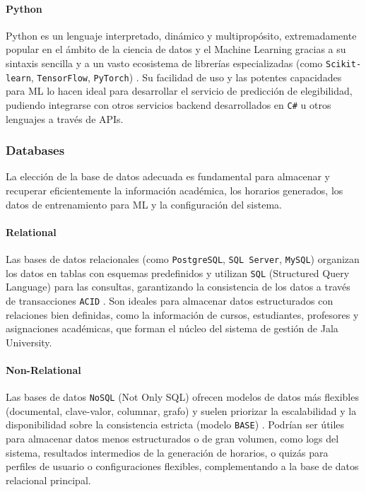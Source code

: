 \paragraph{Python}
Python es un lenguaje interpretado, dinámico y multipropósito, extremadamente popular en el ámbito de la ciencia de datos y el Machine Learning gracias a su sintaxis sencilla y a un vasto ecosistema de librerías especializadas (como \texttt{Scikit-learn}, \texttt{TensorFlow}, \texttt{PyTorch}) \parencite{PythonSoftwareFoundation}.
Su facilidad de uso y las potentes capacidades para ML lo hacen ideal para desarrollar el servicio de predicción de elegibilidad, pudiendo integrarse con otros servicios backend desarrollados en \texttt{C\#} u otros lenguajes a través de APIs.

\subsubsection{Databases}
La elección de la base de datos adecuada es fundamental para almacenar y recuperar eficientemente la información académica, los horarios generados, los datos de entrenamiento para ML y la configuración del sistema.

\paragraph{Relational}
Las bases de datos relacionales (como \texttt{PostgreSQL}, \texttt{SQL Server}, \texttt{MySQL}) organizan los datos en tablas con esquemas predefinidos y utilizan \texttt{SQL} (Structured Query Language) para las consultas, garantizando la consistencia de los datos a través de transacciones \texttt{ACID} \parencite{Date2003}.
Son ideales para almacenar datos estructurados con relaciones bien definidas, como la información de cursos, estudiantes, profesores y asignaciones académicas, que forman el núcleo del sistema de gestión de Jala University.

\paragraph{Non-Relational}
Las bases de datos \texttt{NoSQL} (Not Only SQL) ofrecen modelos de datos más flexibles (documental, clave-valor, columnar, grafo) y suelen priorizar la escalabilidad y la disponibilidad sobre la consistencia estricta (modelo \texttt{BASE}) \parencite{SadalegeFowler2012}.
Podrían ser útiles para almacenar datos menos estructurados o de gran volumen, como logs del sistema, resultados intermedios de la generación de horarios, o quizás para perfiles de usuario o configuraciones flexibles, complementando a la base de datos relacional principal.

